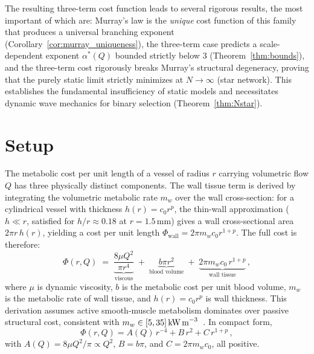 \documentclass[11pt,a4paper]{article}
\theoremstyle{remark}
\begin{document}
The resulting three-term cost function leads to several rigorous results, the
most important of which are: Murray's law is the \emph{unique} cost function
of this family that produces a universal branching exponent
(Corollary~\ref{cor:murray_uniqueness}), the three-term case predicts a
scale-dependent exponent $\alpha^*(Q)$ bounded strictly below 3
(Theorem~\ref{thm:bounds}), and the three-term cost rigorously breaks Murray's
structural degeneracy, proving that the purely static limit strictly minimizes
at $N \to \infty$ (star network). This establishes the fundamental insufficiency
of static models and necessitates dynamic wave mechanics for binary selection
(Theorem~\ref{thm:Nstar}).

\section{Setup}
\label{sec:setup}

The metabolic cost per unit length of a vessel of radius $r$ carrying
volumetric flow $Q$ has three physically distinct components. The wall
tissue term is derived by integrating the volumetric metabolic rate
$m_w$ over the wall cross-section: for a cylindrical vessel with
thickness $h(r) = c_0 r^p$, the thin-wall approximation ($h \ll r$,
satisfied for $h/r \approx 0.18$ at $r = 1.5\,\text{mm}$) gives a
wall cross-sectional area $2\pi r\,h(r)$, yielding a cost per unit
length $\Phi_{\mathrm{wall}} = 2\pi m_w c_0 r^{1+p}$. The full cost
is therefore:
\begin{equation}
  \Phi(r,Q) \;=\; \underbrace{\frac{8\mu Q^2}{\pi r^4}}_{\text{viscous}}
            \;+\; \underbrace{b\pi r^2}_{\text{blood volume}}
            \;+\; \underbrace{2\pi m_w c_0\, r^{1+p}}_{\text{wall tissue}}\,,
  \label{eq:phi}
\end{equation}
where $\mu$ is dynamic viscosity, $b$ is the metabolic cost per unit
blood volume, $m_w$ is the metabolic rate of wall tissue, and $h(r)=c_0 r^p$
is wall thickness. This derivation assumes active smooth-muscle metabolism
dominates over passive structural cost, consistent with $m_w \in [5,
35]\,\text{kW\,m}^{-3}$~\cite{Paul1980}.
In compact form,
\begin{equation}
  \Phi(r,Q) = A(Q)\,r^{-4} + B\,r^2 + C\,r^{1+p}\,,
  \label{eq:phi_compact}
\end{equation}
with $A(Q)=8\mu Q^2/\pi\propto Q^2$, $B=b\pi$, and $C=2\pi m_w c_0$,
all positive.
\end{document}
